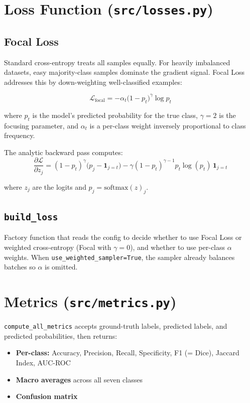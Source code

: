 \documentclass[12pt,a4paper]{report}
\begin{document}
\section{Loss Function (\texttt{src/losses.py})}

\subsection{Focal Loss}

Standard cross-entropy treats all samples equally. For heavily imbalanced datasets, easy majority-class samples dominate the gradient signal. Focal Loss addresses this by down-weighting well-classified examples:

\[
  \mathcal{L}_{\text{focal}} = -\alpha_t \bigl(1 - p_t\bigr)^{\gamma} \log p_t
\]

where $p_t$ is the model's predicted probability for the true class, $\gamma=2$ is the focusing parameter, and $\alpha_t$ is a per-class weight inversely proportional to class frequency.

The analytic backward pass computes:
\[
  \frac{\partial \mathcal{L}}{\partial z_j} =
  (1-p_t)^{\gamma}\bigl(p_j - \mathbf{1}_{j=t}\bigr)
  - \gamma(1-p_t)^{\gamma-1} p_t \log(p_t)\, \mathbf{1}_{j=t}
\]

where $z_j$ are the logits and $p_j = \text{softmax}(z)_j$.

\subsection{\texttt{build\_loss}}

Factory function that reads the config to decide whether to use Focal Loss or weighted cross-entropy (Focal with $\gamma=0$), and whether to use per-class $\alpha$ weights. When \texttt{use\_weighted\_sampler=True}, the sampler already balances batches so $\alpha$ is omitted.

\section{Metrics (\texttt{src/metrics.py})}

\texttt{compute\_all\_metrics} accepts ground-truth labels, predicted labels, and predicted probabilities, then returns:

\begin{itemize}[nosep]
  \item \textbf{Per-class:} Accuracy, Precision, Recall, Specificity, F1 (= Dice), Jaccard Index, AUC-ROC
  \item \textbf{Macro averages} across all seven classes
  \item \textbf{Confusion matrix}
\end{itemize}
\end{document}
